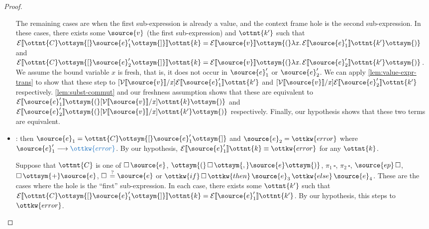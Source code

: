 \documentclass[11pt]{article}
\newcommand{\blue}[1]{ {\color{RoyalBlue}{{#1}}} }
\newcommand{\rrule}[1]{\rref*{#1}}
\begin{document}
\begin{proof}
\begin{itemize}
		The remaining cases are when the first sub-expression is already a value, and the context frame hole is the second sub-expression.
		In these cases, there exists some $\source{v}$ (the first sub-expression) and $\ottnt{k'}$
		such that $ \mathcal{E}\llbracket  \ottnt{C}  \ottsym{[}  \source{e}'_{{\mathrm{1}}}  \ottsym{]}  \rrbracket  \ottnt{k}  =   \mathcal{E}\llbracket  \source{v}  \rrbracket  \ottsym{(}  \lambda  \mathit{x}  \ldotp   \mathcal{E}\llbracket  \source{e}'_{{\mathrm{1}}}  \rrbracket  \ottnt{k'}   \ottsym{)}  $ and $ \mathcal{E}\llbracket  \ottnt{C}  \ottsym{[}  \source{e}'_{{\mathrm{2}}}  \ottsym{]}  \rrbracket  \ottnt{k}  =   \mathcal{E}\llbracket  \source{v}  \rrbracket  \ottsym{(}  \lambda  \mathit{x}  \ldotp   \mathcal{E}\llbracket  \source{e}'_{{\mathrm{2}}}  \rrbracket  \ottnt{k'}   \ottsym{)}  $.
		We assume the bound variable $\mathit{x}$ is fresh, that is, it does not occur in $\source{e}'_{{\mathrm{1}}}$ or $\source{e}'_{{\mathrm{2}}}$.
		We can apply \autoref{lem:value-expr-trans} to show that these step to $ [   \mathcal{V}\llbracket  \source{v}  \rrbracket   /  \mathit{x}  ]   \mathcal{E}\llbracket  \source{e}'_{{\mathrm{1}}}  \rrbracket  \ottnt{k'}  $
		and $ [   \mathcal{V}\llbracket  \source{v}  \rrbracket   /  \mathit{x}  ]   \mathcal{E}\llbracket  \source{e}'_{{\mathrm{2}}}  \rrbracket  \ottnt{k'}  $ respectively. \autoref{lem:subst-commut} and our freshness assumption 
		shows that these are equivalent to
		$ \mathcal{E}\llbracket  \source{e}'_{{\mathrm{1}}}  \rrbracket  \ottsym{(}   [   \mathcal{V}\llbracket  \source{v}  \rrbracket   /  \mathit{x}  ]  \ottnt{k}   \ottsym{)} $ and $ \mathcal{E}\llbracket  \source{e}'_{{\mathrm{2}}}  \rrbracket  \ottsym{(}   [   \mathcal{V}\llbracket  \source{v}  \rrbracket   /  \mathit{x}  ]  \ottnt{k'}   \ottsym{)} $ respectively.
		Finally, our hypothesis shows that these two terms are equivalent.

		\item \rrule{RedContextFail}: then $\source{e}_{{\mathrm{1}}}=\ottnt{C}  \ottsym{[}  \source{e}'_{{\mathrm{1}}}  \ottsym{]} $ and $\source{e}_{{\mathrm{2}}}=\ottkw{error} $ where $\source{e}'_{{\mathrm{1}}}  \longrightarrow   \blue{ \ottkw{error} } $.
		By our hypothesis, $ \mathcal{E}\llbracket  \source{e}'_{{\mathrm{1}}}  \rrbracket  \ottnt{k}  \equiv \ottkw{error}$ for any $\ottnt{k}$.

		Suppose that $\ottnt{C}$ is one of $\square \, \source{e}$, $\ottsym{(} \, \square \, \ottsym{,}  \source{e}  \ottsym{)}$, $\pi_1 \, \square$, $\pi_2 \, \square$, $\source{ep} \, \square$,
		$\square \, \ottsym{+}  \source{e}$, $\square \, \stackrel{?}{=}  \source{e}$ or $\ottkw{if} \, \square \, \ottkw{then} \, \source{e}_{{\mathrm{3}}} \, \ottkw{else} \, \source{e}_{{\mathrm{4}}}$. These are the cases where the hole is the ``first''
		sub-expression. 
		In each case, there exists some $\ottnt{k'}$ such that $ \mathcal{E}\llbracket  \ottnt{C}  \ottsym{[}  \source{e}'_{{\mathrm{1}}}  \ottsym{]}  \rrbracket  \ottnt{k}  =   \mathcal{E}\llbracket  \source{e}'_{{\mathrm{1}}}  \rrbracket  \ottnt{k'}  $. By our hypothesis,
		this steps to $\ottkw{error}$.


\end{itemize}
\end{proof}
\end{document}
